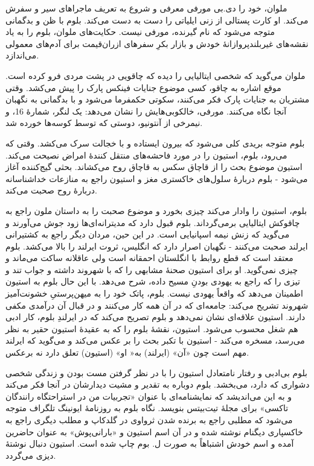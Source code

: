 \documentclass[12pt]{book}
\begin{document}
    ملوان، خود را دی.بی مورفی معرفی و شروع به تعریف ماجراهای سیر و سفرش می‌کند. او کارت پستالی از زنی ایلیاتی را دست به دست می‌کند. بلوم با ظن و بدگمانی متوجه می‌شود که نام گیرنده، مورفی نیست. حکایت‌های ملوان، بلوم را به یاد نقشه‌های غیربلندپروازانۀ خودش و بازار بکرِ سفرهای ازران‌قیمت برای آدم‌های معمولی می‌اندازد.

    ملوان می‌گوید که شخصی ایتالیایی را دیده که چاقویی در پشت مردی فرو کرده است. موقع اشاره به چاقو، کسی موضوع جنایات فینکس پارک را پیش می‌کشد. وقتی مشتریان به جنایات پارک فکر می‌کنند، سکوتی حکمفرما می‌شود و با بدگمانی به نگهبان آنجا نگاه می‌کنند. مورفی، خالکوبی‌هایش را نشان می‌دهد: یک لنگر، شمارۀ 16، و نیمرخی از آنتونیو، دوستی که توسط کوسه‌ها خورده شد.

    بلوم متوجه بریدی کلی می‌شود که بیرون ایستاده و با خجالت سرک می‌کشد. وقتی که می‌رود، بلوم، استیون را در مورد فاحشه‌های منتقل کنندۀ امراض نصیحت می‌کند. استیون موضوع بحث را از قاچاق سکس به قاچاق روح می‌کشاند. بحثی گیج‌کننده آغاز می‌شود - بلوم دربارۀ سلول‌های خاکستری مغز و استیون راجع به منازعات خداشناسانه دربارۀ روح صحبت می‌کند.

    بلوم، استیون را وادار می‌کند چیزی بخورد و موضوع صحبت را به داستان ملون راجع به چاقوکش ایتالیایی برمی‌گرداند. بلوم قبول دارد که مدیترانه‌ای‌ها زود جوش می‌آورند و می‌گوید که زنش نیمه اسپانیایی است. در این حین، مردان دیگر راجع به کشتیرانی ایرلند صحبت می‌کنند - نگهبان اصرار دارد که انگلیس، ثروت ایرلند را بالا می‌کشد. بلوم معتقد است که قطع روابط با انگلستان احمقانه است ولی عاقلانه ساکت می‌ماند و چیزی نمی‌گوید. او برای استیون صحنۀ مشابهی را که با شهروند داشته و جواب تند و تیزی را که راجع به یهودی بودنِ مسیح داده، شرح می‌دهد. با این حال بلوم به استیون اطمینان می‌دهد که واقعاً یهودی نیست. بلوم، پاتک خود را به میهن‌پرستیِ خشونت‌آمیز شهروند تشریح می‌کند: جامعه‌ای که در آن همه کار می‌کنند و در قبال آن درآمدی مکفی دارند. استیون علاقه‌ای نشان نمی‌دهد و بلوم تصریح می‌کند که در ایرلندِ بلوم، کار ادبی هم شغل محسوب می‌شود. استیون، نقشۀ بلوم را که به عقیدۀ استیون حقیر به نظر می‌رسد، مسخره می‌کند - استیون با تکبر بحث را بر عکس می‌کند و می‌گوید که ایرلند مهم است چون «آن» (ایرلند) به« او» (استیون) تعلق دارد نه برعکس.

    بلوم بی‌ادبی و رفتار نامتعادل استیون را با در نظر گرفتن مست بودن و زندگی شخصی دشواری که دارد، می‌بخشد. بلوم دوباره به تقدیر و مشیت دیدارشان در آنجا فکر می‌کند و به این می‌اندیشد که نمایشنامه‌ای با عنوان «تجربیات من در استراحتگاه رانندگان تاکسی» برای مجلۀ تیت‌بیتس بنویسد. نگاه بلوم به روزنامۀ ایونینگ تلگراف متوجه می‌شود که مطلبی راجع به برنده شدن ثرواوی در گلدکاپ و مطلب دیگری راجع به خاکسپاری دیگنام نوشته شده و در آن اسم استیون و «بارانی‌پوش» به عنوان حاضرین آمده و اسم خودش اشتباهاً به صورت ل. بوم چاپ شده است. استیون دنبال نوشتۀ دیزی می‌گردد.
\end{document}
